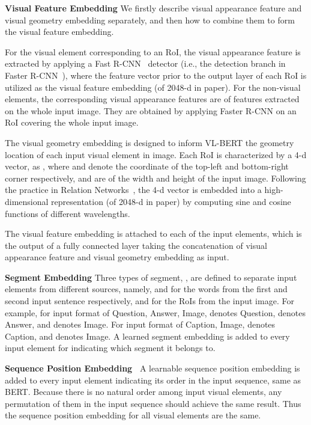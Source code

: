 \documentclass{article} \usepackage{iclr2020_conference,times}
\begin{document}
\textbf{Visual Feature Embedding} We firstly describe visual appearance feature and visual geometry embedding separately, and then how to combine them to form the visual feature embedding. 

For the visual element corresponding to an RoI, the visual appearance feature is extracted by applying a Fast R-CNN~\citep{girshick2015fast} detector (i.e., the detection branch in Faster R-CNN~\citep{ren2015faster}), where the feature vector prior to the output layer of each RoI is utilized as the visual feature embedding (of 2048-d in paper). For the non-visual elements, the corresponding visual appearance features are of features extracted on the whole input image. They are obtained by applying Faster R-CNN on an RoI covering the whole input image. 

The visual geometry embedding is designed to inform VL-BERT the geometry location of each input visual element in image. Each RoI is characterized by a 4-d vector, as , where  and  denote the coordinate of the top-left and bottom-right corner respectively, and  are of the width and height of the input image. Following the practice in Relation Networks~\citep{hu2018relation}, the 4-d vector is embedded into a high-dimensional representation (of 2048-d in paper) by computing sine and cosine functions of different wavelengths.

The visual feature embedding is attached to each of the input elements, which is the output of a fully connected layer taking the concatenation of visual appearance feature and visual geometry embedding as input.


\textbf{Segment Embedding} Three types of segment, , are defined to separate input elements from different sources, namely,  and  for the words from the first and second input sentence respectively, and  for the RoIs from the input image. For example, for input format of Question, Answer, Image,  denotes Question,  denotes Answer, and  denotes Image. For input format of Caption, Image,  denotes Caption, and  denotes Image. A learned segment embedding is added to every input element for indicating which segment it belongs to.


\textbf{Sequence Position Embedding~} A learnable sequence position embedding is added to every input element indicating its order in the input sequence, same as BERT. Because there is no natural order among input visual elements, any permutation of them in the input sequence should achieve the same result. Thus the sequence position embedding for all visual elements are the same. 
\end{document}
